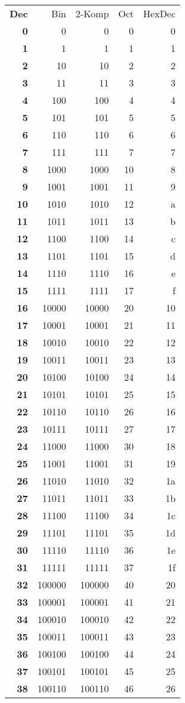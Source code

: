 \documentclass[a4paper]{article}
\begin{document}
\newpage
\begin{tabular}{|>{\bfseries}r | r | r | r | r |}

Dec & Bin & 2-Komp & Oct & HexDec \\

0&0&0&0&0\\
1&1&1&1&1\\
2&10&10&2&2\\
3&11&11&3&3\\
4&100&100&4&4\\
5&101&101&5&5\\
6&110&110&6&6\\
7&111&111&7&7\\
8&1000&1000&10&8\\
9&1001&1001&11&9\\
10&1010&1010&12&a\\
11&1011&1011&13&b\\
12&1100&1100&14&c\\
13&1101&1101&15&d\\
14&1110&1110&16&e\\
15&1111&1111&17&f\\
16&10000&10000&20&10\\
17&10001&10001&21&11\\
18&10010&10010&22&12\\
19&10011&10011&23&13\\
20&10100&10100&24&14\\
21&10101&10101&25&15\\
22&10110&10110&26&16\\
23&10111&10111&27&17\\
24&11000&11000&30&18\\
25&11001&11001&31&19\\
26&11010&11010&32&1a\\
27&11011&11011&33&1b\\
28&11100&11100&34&1c\\
29&11101&11101&35&1d\\
30&11110&11110&36&1e\\
31&11111&11111&37&1f\\
32&100000&100000&40&20\\
33&100001&100001&41&21\\
34&100010&100010&42&22\\
35&100011&100011&43&23\\
36&100100&100100&44&24\\
37&100101&100101&45&25\\
38&100110&100110&46&26\\

\end{tabular}
\end{document}
